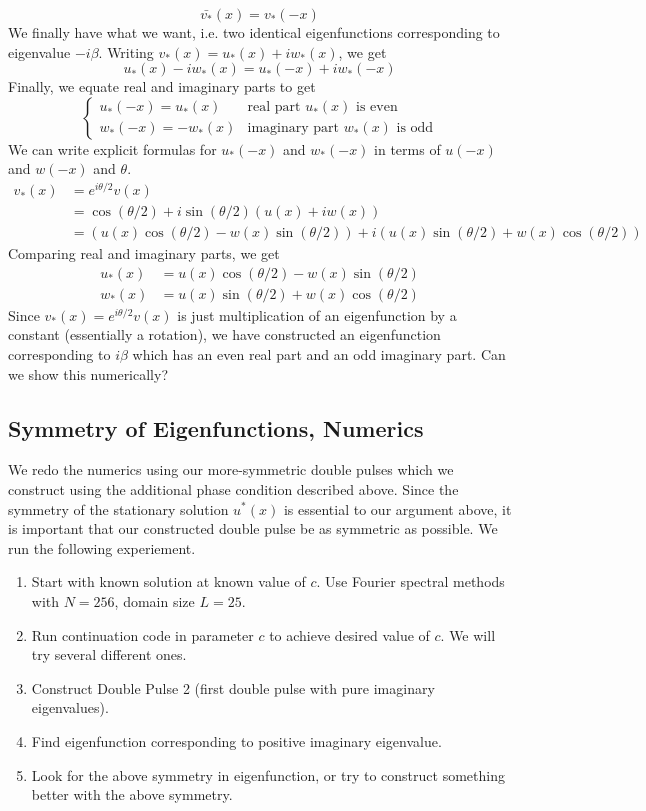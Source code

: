 \documentclass[12pt]{article}
\begin{document}
\[
\bar{v_*}(x) = v_*(-x)
\]
We finally have what we want, i.e. two identical eigenfunctions corresponding to eigenvalue $-i \beta$. Writing $v_*(x) = u_*(x) + i w_*(x)$, we get 
\[
 u_*(x) - i w_*(x) =  u_*(-x) + i w_*(-x)
\]
Finally, we equate real and imaginary parts to get
\[ \begin{cases}
u_*(-x) = u_*(x)&\text{real part $u_*(x)$ is even}\\
w_*(-x) = -w_*(x)&\text{imaginary part $w_*(x)$ is odd}
\end{cases}\]
We can write explicit formulas for $u_*(-x)$ and $w_*(-x)$ in terms of $u(-x)$ and $w(-x)$ and $\theta$.
\begin{align*}
v_*(x) &= e^{i\theta/2} v(x) \\
&= \cos(\theta/2) + i\sin(\theta/2)(u(x) + i w(x))\\
&= \left( u(x) \cos(\theta/2) - w(x) \sin(\theta/2) \right) + i \left( u(x) \sin(\theta/2) + w(x) \cos(\theta/2)\right)
\end{align*}
Comparing real and imaginary parts, we get
\begin{align*}
u_*(x) &= u(x) \cos(\theta/2) - w(x) \sin(\theta/2) \\
w_*(x) &= u(x) \sin(\theta/2) + w(x) \cos(\theta/2)
\end{align*}
Since $v_*(x) = e^{i\theta/2} v(x)$ is just multiplication of an eigenfunction by a constant (essentially a rotation), we have constructed an eigenfunction corresponding to $i \beta$ which has an even real part and an odd imaginary part. Can we show this numerically?

\subsection*{Symmetry of Eigenfunctions, Numerics}
We redo the numerics using our more-symmetric double pulses which we construct using the additional phase condition described above. Since the symmetry of the stationary solution $u^*(x)$ is essential to our argument above, it is important that our constructed double pulse be as symmetric as possible. We run the following experiement.
\begin{enumerate}
	\item Start with known solution at known value of $c$. Use Fourier spectral methods with $N = 256$, domain size $L = 25$.
	\item Run continuation code in parameter $c$ to achieve desired value of $c$. We will try several different ones.
	\item Construct Double Pulse 2 (first double pulse with pure imaginary eigenvalues).
	\item Find eigenfunction corresponding to positive imaginary eigenvalue.
	\item Look for the above symmetry in eigenfunction, or try to construct something better with the above symmetry.
\end{enumerate}
\end{document}
